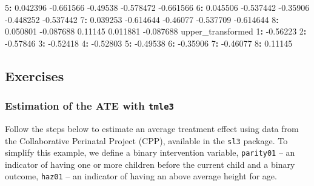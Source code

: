 \documentclass[12pt, krantz2,]{krantz}
\newenvironment{Shaded}{\begin{snugshade}}{\end{snugshade}}
\newcommand{\DecValTok}[1]{\textcolor[rgb]{0.06,0.06,0.06}{#1}}
\newcommand{\FloatTok}[1]{\textcolor[rgb]{0.06,0.06,0.06}{#1}}
\newcommand{\NormalTok}[1]{#1}
\newcommand{\OperatorTok}[1]{\textcolor[rgb]{0.43,0.43,0.43}{\textbf{#1}}}
\newcommand{\StringTok}[1]{\textcolor[rgb]{0.5,0.5,0.5}{#1}}
\theoremstyle{definition}
\theoremstyle{definition}
\theoremstyle{definition}
\newcommand{\1}{\mathbbm{1}}
\begin{document}
\begin{Shaded}
\begin{Highlighting}[]
\DecValTok{5}\OperatorTok{:}\StringTok{ }\FloatTok{0.042396} \FloatTok{-0.661566} \FloatTok{-0.49538}       \FloatTok{-0.578472}         \FloatTok{-0.661566}
\DecValTok{6}\OperatorTok{:}\StringTok{ }\FloatTok{0.045506} \FloatTok{-0.537442} \FloatTok{-0.35906}       \FloatTok{-0.448252}         \FloatTok{-0.537442}
\DecValTok{7}\OperatorTok{:}\StringTok{ }\FloatTok{0.039253} \FloatTok{-0.614644} \FloatTok{-0.46077}       \FloatTok{-0.537709}         \FloatTok{-0.614644}
\DecValTok{8}\OperatorTok{:}\StringTok{ }\FloatTok{0.050801} \FloatTok{-0.087688}  \FloatTok{0.11145}        \FloatTok{0.011881}         \FloatTok{-0.087688}
\NormalTok{   upper_transformed}
\DecValTok{1}\OperatorTok{:}\StringTok{          }\FloatTok{-0.56223}
\DecValTok{2}\OperatorTok{:}\StringTok{          }\FloatTok{-0.57846}
\DecValTok{3}\OperatorTok{:}\StringTok{          }\FloatTok{-0.52418}
\DecValTok{4}\OperatorTok{:}\StringTok{          }\FloatTok{-0.52803}
\DecValTok{5}\OperatorTok{:}\StringTok{          }\FloatTok{-0.49538}
\DecValTok{6}\OperatorTok{:}\StringTok{          }\FloatTok{-0.35906}
\DecValTok{7}\OperatorTok{:}\StringTok{          }\FloatTok{-0.46077}
\DecValTok{8}\OperatorTok{:}\StringTok{           }\FloatTok{0.11145}
\end{Highlighting}
\end{Shaded}

\hypertarget{exercises-1}{%
\subsection{Exercises}\label{exercises-1}}

\hypertarget{tmle3-ex1}{%
\subsubsection{\texorpdfstring{Estimation of the ATE with \texttt{tmle3}}{Estimation of the ATE with tmle3}}\label{tmle3-ex1}}

Follow the steps below to estimate an average treatment effect using data from
the Collaborative Perinatal Project (CPP), available in the \texttt{sl3} package. To
simplify this example, we define a binary intervention variable, \texttt{parity01} --
an indicator of having one or more children before the current child and a
binary outcome, \texttt{haz01} -- an indicator of having an above average height for
age.
\end{document}
